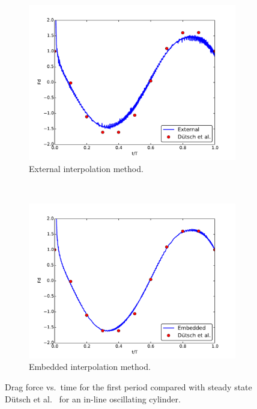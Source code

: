 \documentclass[preprint,12pt]{elsarticle}
\begin{document}
\begin{figure}[!htb]
	\centering
	\par\medskip
	\begin{subfigure}{0.4\textwidth}
		\includegraphics[width=\linewidth]{staticexinit}
		\caption{External interpolation method.}
	\end{subfigure}
	~
	\begin{subfigure}{0.4\textwidth}
		\includegraphics[width=\linewidth]{staticeminit}
		\caption{Embedded interpolation method.}
	\end{subfigure}
	\caption{Drag force vs.~time for the first period compared with steady state D\"{u}tsch et al.~\cite{dutsch1998low} for an in-line oscillating cylinder.}
	\label{fig:staticInit}
\end{figure}
\end{document}
